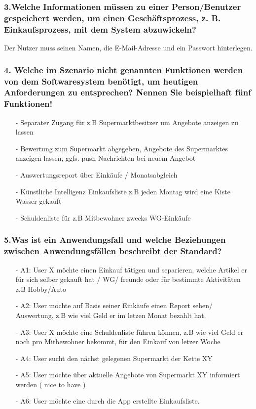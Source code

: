 \documentclass[12pt,a4paper]{article}
\begin{document}
\subsubsection*{3.Welche Informationen müssen zu einer Person/Benutzer gespeichert werden, um einen Geschäftsprozess, z. B. Einkaufsprozess, mit dem System abzuwickeln?}

 Der Nutzer muss seinen Namen, die E-Mail-Adresse und ein Passwort hinterlegen.
 
\subsubsection*{4. Welche im Szenario nicht genannten Funktionen werden von dem Softwaresystem benötigt, um heutigen Anforderungen zu entsprechen? Nennen Sie beispielhaft fünf Funktionen!}
\begin{itemize}
\item[-]Separater Zugang für z.B Supermarktbesitzer um Angebote anzeigen zu lassen
\item[-]Bewertung zum Supermarkt abgegeben, Angebote des Supermarktes anzeigen lassen, ggfs. push Nachrichten bei neuem Angebot
\item[-]Auswertungsreport über Einkäufe / Monatsabgleich
\item[-]Künstliche Intelligenz Einkaufsliste  z.B jeden Montag wird eine Kiste Wasser gekauft
\item[-]Schuldenliste für z.B Mitbewohner zwecks WG-Einkäufe
\end{itemize}
 
 
\subsubsection*{5.Was ist ein Anwendungsfall und welche Beziehungen zwischen Anwendungsfällen beschreibt der Standard?}
\begin{itemize}
\item[-]A1: User X möchte einen Einkauf tätigen und separieren, welche Artikel er für sich selber gekauft hat / WG/ freunde oder für bestimmte Aktivitäten z.B Hobby/Auto 
\item[-]A2: User möchte auf Basis seiner Einkäufe einen Report sehen/ Auswertung, z.B wie viel Geld er im letzen Monat bezahlt hat. 
\item[-]A3: User X möchte eine Schuldenliste führen können, z.B wie viel Geld er noch pro Mitbewohner bekommt, für den Einkauf von letzer Woche
\item[-]A4: User sucht den nächst gelegenen Supermarkt der Kette XY
\item[-]A5: User möchte über aktuelle Angebote von Supermarkt XY informiert werden ( nice to have )
\item[-]A6: User möchte eine durch die App erstellte Einkaufsliste.
\end{itemize}
\newpage
\end{document}
